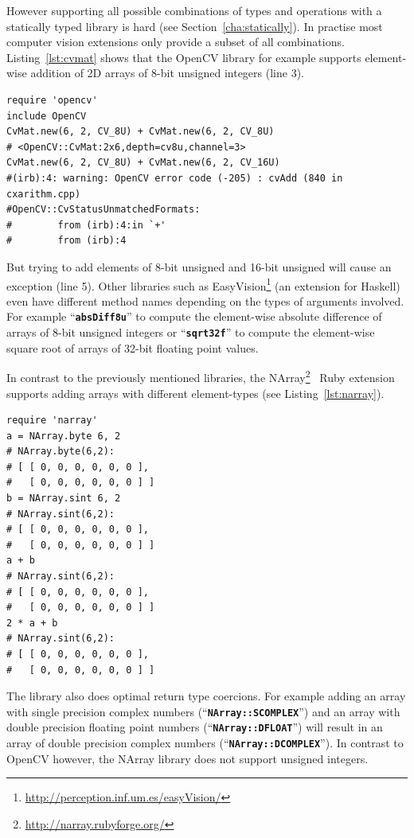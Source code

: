 \documentclass[12pt,a4paper,oneside,openright]{book}
\newcommand{\Eg}{For example }
\newcommand{\sct}[1]{Section~\ref{cha:#1}}
\newcommand{\lst}[1]{Listing~\ref{lst:#1}}
\newcommand{\code}[1]{``\texttt{\textbf{\textcolor{codegray}{\small{#1}}}}''}
\newcommand{\rubyout}{Comment lines (preceded with ``\#'') show the output of the program}
\begin{document}
\begin{CJK}{UTF8}{}
However supporting all possible combinations of types and operations with a statically typed library is hard (see \sct{statically}). In practise most computer vision extensions only provide a subset of all combinations. \lst{cvmat} shows that the OpenCV library for example supports element-wise addition of \ac{2D} arrays of 8-bit unsigned integers (line 3).
\lstset{language=Ruby,frame=single,numbers=left}
\begin{lstlisting}[float=htbp,caption={Using OpenCV in Ruby. \rubyout},label=lst:cvmat]
require 'opencv'
include OpenCV
CvMat.new(6, 2, CV_8U) + CvMat.new(6, 2, CV_8U)
# <OpenCV::CvMat:2x6,depth=cv8u,channel=3>
CvMat.new(6, 2, CV_8U) + CvMat.new(6, 2, CV_16U)
#(irb):4: warning: OpenCV error code (-205) : cvAdd (840 in cxarithm.cpp)
#OpenCV::CvStatusUnmatchedFormats: 
#        from (irb):4:in `+'
#        from (irb):4
\end{lstlisting}
But trying to add elements of 8-bit unsigned and 16-bit unsigned will cause an exception (line 5). Other libraries such as EasyVision\footnote{\url{http://perception.inf.um.es/easyVision/}} (an extension for Haskell) even have different method names depending on the types of arguments involved. \Eg \code{absDiff8u} to compute the element-wise absolute difference of arrays of 8-bit unsigned integers or \code{sqrt32f} to compute the element-wise square root of arrays of 32-bit floating point values.

In contrast to the previously mentioned libraries, the NArray\footnote{\url{http://narray.rubyforge.org/}}~\citep{narray1,narray2} Ruby extension supports adding arrays with different element-types (see \lst{narray}).
\lstset{language=Ruby,frame=single,numbers=none}
\begin{lstlisting}[float=htbp,caption={Using NArray in Ruby. \rubyout},label=lst:narray]
require 'narray'
a = NArray.byte 6, 2
# NArray.byte(6,2): 
# [ [ 0, 0, 0, 0, 0, 0 ], 
#   [ 0, 0, 0, 0, 0, 0 ] ]
b = NArray.sint 6, 2
# NArray.sint(6,2): 
# [ [ 0, 0, 0, 0, 0, 0 ], 
#   [ 0, 0, 0, 0, 0, 0 ] ]
a + b
# NArray.sint(6,2): 
# [ [ 0, 0, 0, 0, 0, 0 ], 
#   [ 0, 0, 0, 0, 0, 0 ] ]
2 * a + b
# NArray.sint(6,2): 
# [ [ 0, 0, 0, 0, 0, 0 ], 
#   [ 0, 0, 0, 0, 0, 0 ] ]
\end{lstlisting}
The library also does optimal return type coercions. \Eg adding an array with single precision complex numbers (\code{NArray::SCOMPLEX}) and an array with double precision floating point numbers (\code{NArray::DFLOAT}) will result in an array of double precision complex numbers (\code{NArray::DCOMPLEX}). In contrast to OpenCV however, the NArray library does not support unsigned integers.


\end{CJK}
\end{document}
